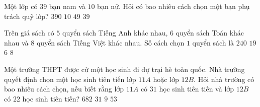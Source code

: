 


\begin{ex}%
	Một lớp có $39$ bạn nam và $10$ bạn nữ. Hỏi có bao nhiêu cách chọn một bạn phụ trách quỹ lớp?
	\choice
	{$390$}
	{$10$}
	{\True $49$}
	{$39$}
\end{ex}


\begin{ex}%
	Trên giá sách có $5$ quyển sách Tiếng Anh khác nhau, $6$ quyển sách Toán khác nhau và $8$ quyển sách Tiếng Việt khác nhau. Số cách chọn $1$ quyển sách là
	\choice
	{$240$}
	{\True $19$}
	{$6$}
	{$8$}
\end{ex}

\begin{ex}%
	Một trường THPT được cử một học sinh đi dự trại hè toàn quốc. Nhà trường quyết định chọn một học sinh tiên tiến lớp $11A$ hoặc lớp $12B$. Hỏi nhà trường có bao nhiêu cách chọn, nếu biết rằng lớp $11A$ có $31$ học sinh tiên tiến và lớp $12B$ có $22$ học sinh tiên tiến?
	\choice
	{$682$}
	{$31$}
	{$9$}
	{\True $53$}
\end{ex}

